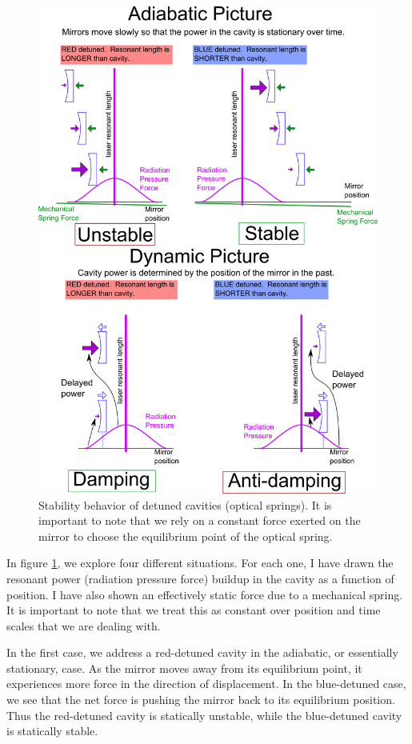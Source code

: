 \begin{figure}[htbp]%
\center
\includegraphics[width=.9\textwidth]{figures/introduction/cavity}%
\caption[Optical spring stability]{Stability behavior of detuned cavities (optical springs). It is important to note that we rely on a constant force exerted on the mirror to choose the equilibrium point of the optical spring.}%
\label{fig:opticalsprings}%
\end{figure}

In figure \ref{fig:opticalsprings}, we explore four different situations. For each one, I have drawn the resonant power (radiation pressure force) buildup in the cavity as a function of position. I have also shown an effectively static force due to a mechanical spring. It is important to note that we treat this as constant over position and time scales that we are dealing with.

In the first case, we address a red-detuned cavity in the adiabatic, or essentially stationary, case. As the mirror moves away from its equilibrium point, it experiences more force in the direction of displacement. In the blue-detuned case, we see that the net force is pushing the mirror back to its equilibrium position. Thus the red-detuned cavity is statically unstable, while the blue-detuned cavity is statically stable.

